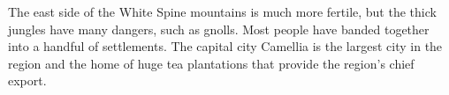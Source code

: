 The east side of the White Spine mountains is much more fertile, but the thick jungles have many dangers, such as gnolls.
Most people have banded together into a handful of settlements.
The capital city Camellia is the largest city in the region and the home of huge tea plantations that provide the region's chief export.
